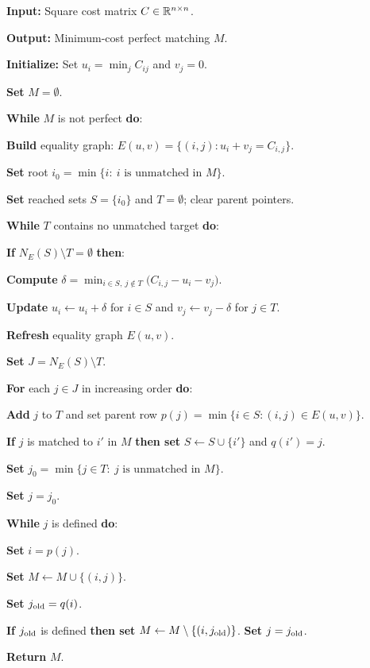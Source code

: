 \begin{alg}\label{alg:hungarian-primal-dual}
\textbf{Input:} Square cost matrix $C\in\mathbb{R}^{n\times n}$.

\textbf{Output:} Minimum-cost perfect matching $M$.

\textbf{Initialize:} Set $u_i=\min_j C_{ij}$ and $v_j=0$.

\textbf{Set} $M=\emptyset$.

\textbf{While} $M$ is not perfect \textbf{do}:
\begin{algblock}

\textbf{Build} equality graph:
\(E(u,v)=\{(i,j):u_i+v_j=C_{i,j}\}.\)

\textbf{Set} root $i_0=\min\{i:\ i\text{ is unmatched in }M\}$.

\textbf{Set} reached sets $S=\{i_0\}$ and $T=\emptyset$; clear parent pointers.

\textbf{While} $T$ contains no unmatched target \textbf{do}:
\begin{algblock}

\textbf{If} $N_E(S)\setminus T=\emptyset$ \textbf{then}:
\begin{algblock}

\textbf{Compute} $\delta=\min_{i\in S,\ j\notin T}\bigl(C_{i,j}-u_i-v_j\bigr)$.

\textbf{Update} $u_i\leftarrow u_i+\delta$ for $i\in S$ and $v_j\leftarrow v_j-\delta$ for $j\in T$.

\textbf{Refresh} equality graph $E(u,v)$.

\end{algblock}
\textbf{Set} $J=N_E(S)\setminus T$.

\textbf{For} each $j\in J$ in increasing order \textbf{do}:
\begin{algblock}

\textbf{Add} $j$ to $T$ and set parent row $p(j)=\min\{i\in S:(i,j)\in E(u,v)\}$.

\textbf{If} $j$ is matched to $i'$ in $M$ \textbf{then set} \(S\leftarrow S\cup\{i'\}\) and \(q(i')=j\).

\end{algblock}
\end{algblock}
\textbf{Set} $j_0=\min\{j\in T:\ j\text{ is unmatched in }M\}$.

\textbf{Set} $j=j_0$.

\textbf{While} $j$ is defined \textbf{do}:
\begin{algblock}

\textbf{Set} $i=p(j)$.

\textbf{Set} $M\leftarrow M\cup\{(i,j)\}$.

\textbf{Set} $j_{\rm old}=q(i)$.

\textbf{If} $j_{\rm old}$ is defined \textbf{then set} \(M\leftarrow M\setminus\{(i,j_{\rm old})\}\).
\textbf{Set} $j=j_{\rm old}$.
\end{algblock}
\end{algblock}
\algreturnskip
\textbf{Return} $M$.
\end{alg}

